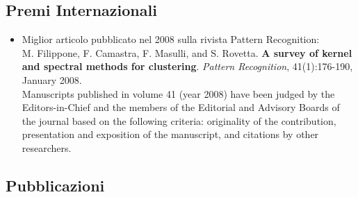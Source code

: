 \documentclass[a4paper,10pt]{article}
\begin{document}

\newpage

\subsection*{Premi Internazionali}
\begin{itemize}
     \item Miglior articolo pubblicato nel 2008 sulla rivista Pattern Recognition:
       \\M. Filippone, F. Camastra, F. Masulli, and S. Rovetta.
       \textbf{A survey of kernel and spectral methods for clustering}.
       \emph{Pattern Recognition}, 41(1):176-190, January 2008.
       \\Manuscripts published in volume 41 (year 2008) have been judged by the Editors-in-Chief and the members of the Editorial and Advisory Boards of the journal based on the following criteria: originality of the contribution, presentation and exposition of the manuscript, and citations by other researchers.
\end{itemize}

\subsection*{Pubblicazioni}
\end{document}
